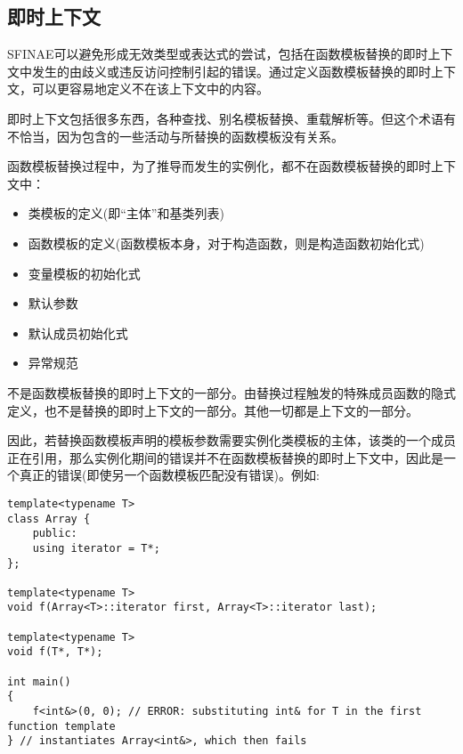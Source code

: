 \subsection{即时上下文}

SFINAE可以避免形成无效类型或表达式的尝试，包括在函数模板替换的即时上下文中发生的由歧义或违反访问控制引起的错误。通过定义函数模板替换的即时上下文，可以更容易地定义不在该上下文中的内容。

\begin{tcolorbox}[colback=webgreen!5!white,colframe=webgreen!75!black]
\hspace*{0.75cm}即时上下文包括很多东西，各种查找、别名模板替换、重载解析等。但这个术语有不恰当，因为包含的一些活动与所替换的函数模板没有关系。
\end{tcolorbox}

函数模板替换过程中，为了推导而发生的实例化，都不在函数模板替换的即时上下文中：

\begin{itemize}
\item 
类模板的定义(即“主体”和基类列表)

\item 
函数模板的定义(函数模板本身，对于构造函数，则是构造函数初始化式)

\item 
变量模板的初始化式

\item 
默认参数

\item 
默认成员初始化式

\item 
异常规范
\end{itemize}

不是函数模板替换的即时上下文的一部分。由替换过程触发的特殊成员函数的隐式定义，也不是替换的即时上下文的一部分。其他一切都是上下文的一部分。

因此，若替换函数模板声明的模板参数需要实例化类模板的主体，该类的一个成员正在引用，那么实例化期间的错误并不在函数模板替换的即时上下文中，因此是一个真正的错误(即使另一个函数模板匹配没有错误)。例如:

\begin{lstlisting}[style=styleCXX]
template<typename T>
class Array {
	public:
	using iterator = T*;
};

template<typename T>
void f(Array<T>::iterator first, Array<T>::iterator last);

template<typename T>
void f(T*, T*);

int main()
{
	f<int&>(0, 0); // ERROR: substituting int& for T in the first function template
} // instantiates Array<int&>, which then fails
\end{lstlisting}

